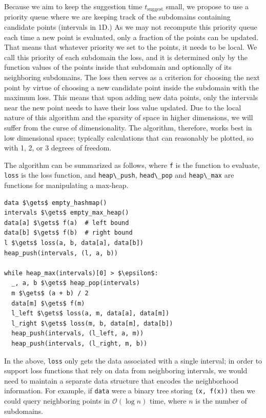 Because we aim to keep the suggestion time $t_\textrm{suggest}$ small, we propose to use a priority queue where we are keeping track of the subdomains containing candidate points (intervals in 1D.)
As we may not recompute this priority queue each time a new point is evaluated, only a fraction of the points can be updated.
That means that whatever priority we set to the points, it needs to be local.
We call this priority of each subdomain the loss, and it is determined only by the function values of the points inside that subdomain and optionally of its neighboring subdomains.
The loss then serves as a criterion for choosing the next point by virtue of choosing a new candidate point inside the subdomain with the maximum loss.
This means that upon adding new data points, only the intervals near the new point needs to have their loss value updated.
Due to the local nature of this algorithm and the sparsity of space in higher dimensions, we will suffer from the curse of dimensionality.
The algorithm, therefore, works best in low dimensional space; typically calculations that can reasonably be plotted, so with 1, 2, or 3 degrees of freedom.

The algorithm can be summarized as follows, where \passthrough{\lstinline!f!} is the function to evaluate, \passthrough{\lstinline!loss!} is the loss function, and \passthrough{\lstinline!heap\_push!}, \passthrough{\lstinline!head\_pop!} and \passthrough{\lstinline!heap\_max!} are functions for manipulating a max-heap.

\begin{lstlisting}
data $\gets$ empty_hashmap()
intervals $\gets$ empty_max_heap()
data[a] $\gets$ f(a)  # left bound
data[b] $\gets$ f(b)  # right bound
l $\gets$ loss(a, b, data[a], data[b])
heap_push(intervals, (l, a, b))

while heap_max(intervals)[0] > $\epsilon$:
  _, a, b $\gets$ heap_pop(intervals)
  m $\gets$ (a + b) / 2
  data[m] $\gets$ f(m)
  l_left $\gets$ loss(a, m, data[a], data[m])
  l_right $\gets$ loss(m, b, data[m], data[b])
  heap_push(intervals, (l_left, a, m))
  heap_push(intervals, (l_right, m, b))
\end{lstlisting}

In the above, \passthrough{\lstinline!loss!} only gets the data associated with a single interval;
in order to support loss functions that rely on data from neighboring intervals, we would need to maintain a separate data structure that encodes the neighborhood information.
For example, if \passthrough{\lstinline!data!} were a binary tree storing \passthrough{\lstinline!(x, f(x))!} then we could query neighboring points in $\mathcal{O}(\log n)$ time, where $n$ is the number of subdomains.

